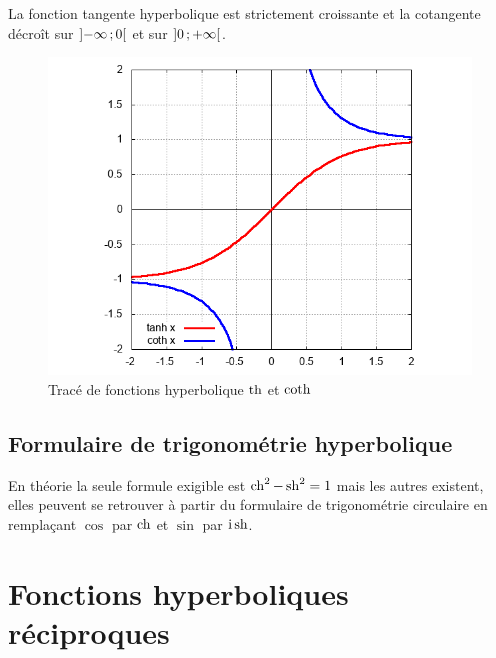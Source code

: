 La fonction tangente hyperbolique est strictement croissante et la cotangente décroît sur $\left] -\infty \, ;  0 \right[$ et sur $\left] 0 \, ;  +\infty \right[$.
%
\begin{figure}
  \centering
  \includegraphics[scale=0.4,angle=-90]{tanh.png}
  \caption{Tracé de fonctions hyperbolique $\operatorname{th}$ et $\operatorname{coth}$}
  \label{fig:tracetanhcoth}
\end{figure}
%
\subsection{Formulaire de trigonométrie hyperbolique}
\label{subsec:chap1-formulairetrigohyp}
En théorie la seule formule exigible est $\operatorname{ch}^2-\operatorname{sh}^2=1$ mais les autres existent, elles peuvent se retrouver à partir du formulaire de trigonométrie circulaire en remplaçant $\cos$ par $\operatorname{ch}$ et $\sin$ par $\operatorname{i} \operatorname{sh}$.
%
\section{Fonctions hyperboliques réciproques}
\label{sec:chap1-fonctionshyprec}
